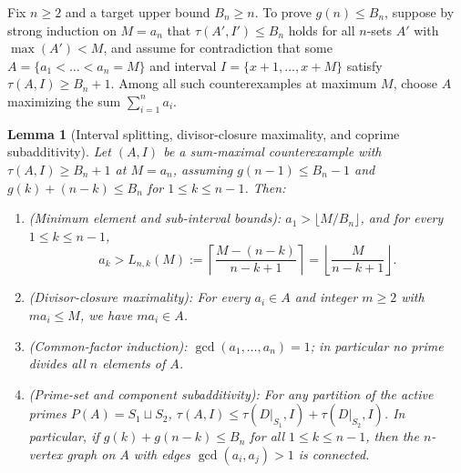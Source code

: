 \documentclass[11pt]{article}
\newtheorem{lemma}[theorem]{Lemma}
\begin{document}
Fix $n \ge 2$ and a target upper bound $B_n \ge n$. To prove $g(n) \le B_n$, suppose by strong induction on $M = a_n$ that $\tau(A', I') \le B_n$ holds for all $n$-sets $A'$ with $\max(A') < M$, and assume for contradiction that some $A = \{a_1 < \dots < a_n = M\}$ and interval $I = \{x + 1, \dots, x + M\}$ satisfy $\tau(A, I) \ge B_n + 1$. Among all such counterexamples at maximum $M$, choose $A$ maximizing the sum $\sum_{i = 1}^n a_i$.

\begin{lemma}[Interval splitting, divisor-closure maximality, and coprime subadditivity]
\label{lem:struct}
Let $(A, I)$ be a sum-maximal counterexample with $\tau(A, I) \ge B_n + 1$ at $M = a_n$, assuming $g(n - 1) \le B_n - 1$ and $g(k) + (n - k) \le B_n$ for $1 \le k \le n - 1$. Then:
\begin{enumerate}
\item \emph{(Minimum element and sub-interval bounds):} $a_1 > \lfloor M / B_n \rfloor$, and for every $1 \le k \le n - 1$,
\[
a_k > L_{n, k}(M) := \left\lceil \frac{M - (n - k)}{n - k + 1} \right\rceil = \left\lfloor \frac{M}{n - k + 1} \right\rfloor.
\]
\item \emph{(Divisor-closure maximality):} For every $a_i \in A$ and integer $m \ge 2$ with $m a_i \le M$, we have $m a_i \in A$.
\item \emph{(Common-factor induction):} $\gcd(a_1, \dots, a_n) = 1$; in particular no prime divides all $n$ elements of $A$.
\item \emph{(Prime-set and component subadditivity):} For any partition of the active primes $P(A) = S_1 \sqcup S_2$, $\tau(A, I) \le \tau(D|_{S_1}, I) + \tau(D|_{S_2}, I)$. In particular, if $g(k) + g(n - k) \le B_n$ for all $1 \le k \le n - 1$, then the $n$-vertex graph on $A$ with edges $\gcd(a_i, a_j) > 1$ is connected.
\end{enumerate}
\end{lemma}
\end{document}
